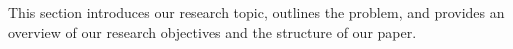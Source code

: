 This section introduces our research topic, outlines the problem, and provides an overview of our research objectives and the structure of our paper.